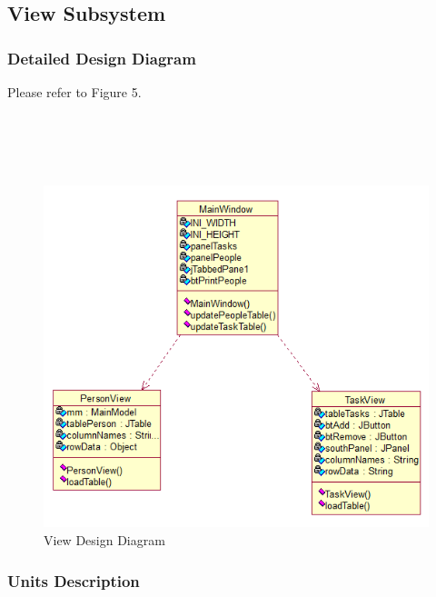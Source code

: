 \documentclass[12pt]{article}
\begin{document}
\subsection{View Subsystem}

\subsubsection{Detailed Design Diagram}

Please refer to Figure 5.\\\\\\\\\\

\begin{figure}[htbp]
\begin{center} \includegraphics[scale=.55]{Diagrams/view_diagram.png} \end{center}
\caption{View Design Diagram}
\label{fig:model-diagram2}
\end{figure}

\subsubsection{Units Description}
\end{document}
